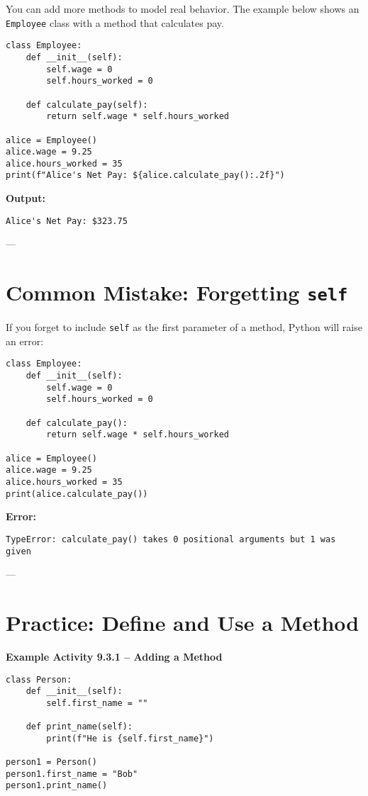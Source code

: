 You can add more methods to model real behavior.  
The example below shows an \texttt{Employee} class with a method that calculates pay.

\begin{verbatim}
class Employee:
    def __init__(self):
        self.wage = 0
        self.hours_worked = 0

    def calculate_pay(self):
        return self.wage * self.hours_worked

alice = Employee()
alice.wage = 9.25
alice.hours_worked = 35
print(f"Alice's Net Pay: ${alice.calculate_pay():.2f}")
\end{verbatim}

\textbf{Output:}
\begin{verbatim}
Alice's Net Pay: $323.75
\end{verbatim}

---

\section{Common Mistake: Forgetting \texttt{self}}

If you forget to include \texttt{self} as the first parameter of a method, Python will raise an error:

\begin{verbatim}
class Employee:
    def __init__(self):
        self.wage = 0
        self.hours_worked = 0

    def calculate_pay():
        return self.wage * self.hours_worked

alice = Employee()
alice.wage = 9.25
alice.hours_worked = 35
print(alice.calculate_pay())
\end{verbatim}

\textbf{Error:}
\begin{verbatim}
TypeError: calculate_pay() takes 0 positional arguments but 1 was given
\end{verbatim}

---

\section{Practice: Define and Use a Method}

\textbf{Example Activity 9.3.1 – Adding a Method}

\begin{verbatim}
class Person:
    def __init__(self):
        self.first_name = ""

    def print_name(self):
        print(f"He is {self.first_name}")

person1 = Person()
person1.first_name = "Bob"
person1.print_name()
\end{verbatim}

